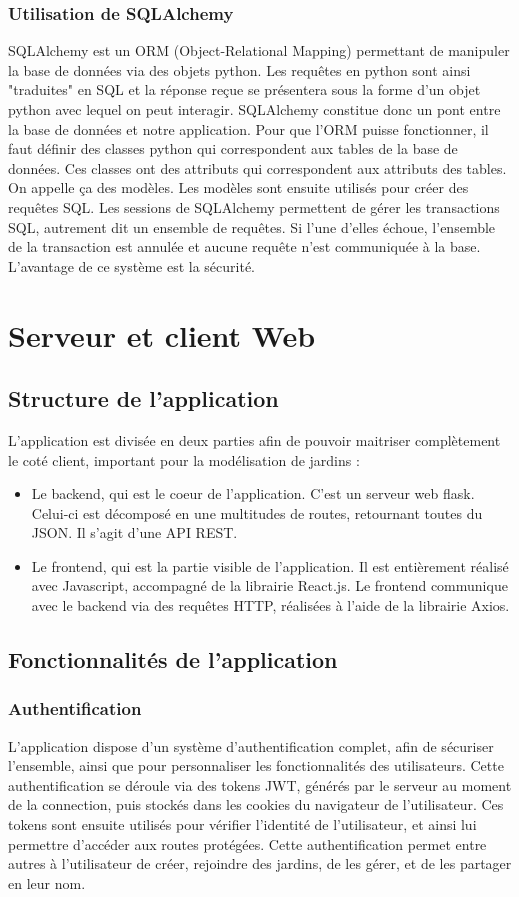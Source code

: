 \documentclass[french,a4paper]{article}
\begin{document}
\subsubsection{Utilisation de SQLAlchemy}
SQLAlchemy est un ORM (Object-Relational Mapping) permettant de manipuler la base de données via des objets python. Les requêtes en
python sont ainsi "traduites" en SQL et la réponse reçue se présentera sous la forme d’un objet python avec lequel on peut interagir.
SQLAlchemy constitue donc un pont entre la base de données et notre application. Pour que l’ORM puisse fonctionner, il faut définir
des classes python qui correspondent aux tables de la base de données. Ces classes ont des attributs qui correspondent aux attributs
des tables. On appelle ça des modèles. Les modèles sont ensuite utilisés pour créer des requêtes SQL.
Les sessions de SQLAlchemy permettent de gérer les transactions SQL, autrement dit un ensemble de requêtes. Si l'une d'elles échoue,
l'ensemble de la transaction est annulée et aucune requête n'est communiquée à la base. L’avantage de ce système est la sécurité.
\newpage
\section{Serveur et client Web}
\subsection{Structure de l'application}
L'application est divisée en deux parties afin de pouvoir maitriser complètement le coté client, important pour la modélisation de jardins :
\begin{itemize}
    \item Le backend, qui est le coeur de l'application. C'est un serveur web flask. Celui-ci est décomposé en une multitudes de routes, retournant toutes du JSON. Il s'agit d'une API REST.
    \item Le frontend, qui est la partie visible de l'application. Il est entièrement réalisé avec Javascript, accompagné de la librairie React.js. Le frontend communique avec le backend via des requêtes HTTP, réalisées à l'aide de la librairie Axios.
\end{itemize}
\subsection{Fonctionnalités de l'application}
\subsubsection{Authentification}
L'application dispose d'un système d'authentification complet, afin de sécuriser l'ensemble, ainsi que pour personnaliser les fonctionnalités des utilisateurs. Cette authentification se déroule via des tokens JWT, générés par le serveur au moment de la connection, puis stockés dans les cookies du navigateur de l'utilisateur. Ces tokens sont ensuite utilisés pour vérifier l'identité de l'utilisateur, et ainsi lui permettre d'accéder aux routes protégées.
Cette authentification permet entre autres à l'utilisateur de créer, rejoindre des jardins, de les gérer, et de les partager en leur nom.
\end{document}
